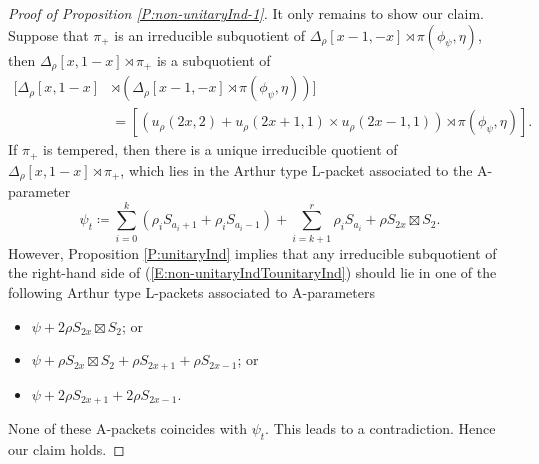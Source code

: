 \documentclass[11pt,letterpaper]{amsart}
\theoremstyle{plain}
\numberwithin{theorem}{section}
\numberwithin{equation}{subsection}
\theoremstyle{remark}
\begin{document}
\begin{proof}[Proof of Proposition \ref{P:non-unitaryInd-1}]
\vskip 5pt

It only remains to show our claim. Suppose that $\pi_+$ is an irreducible subquotient of $\Delta_\rho\left[x-1,-x\right] \rtimes \pi\left(\phi_\psi,\eta\right)$, then $\Delta_\rho\left[x,1-x\right]\rtimes \pi_+$ is a subquotient of
\begin{equation}\label{E:non-unitaryIndTounitaryInd}
\begin{aligned}
    \big[\Delta_\rho\left[x,1-x\right]&\rtimes \left(\Delta_\rho\left[x-1,-x\right] \rtimes \pi\left(\phi_\psi,\eta\right)\right)\big]\\
    & = \left[\left(u_\rho\left(2x,2\right) + u_\rho\left(2x+1,1\right) \times u_\rho\left(2x-1,1\right)\right)\rtimes \pi\left(\phi_\psi,\eta\right)\right].
\end{aligned}    
\end{equation}
If $\pi_+$ is tempered, then there is a unique irreducible quotient of $\Delta_\rho\left[x,1-x\right]\rtimes \pi_+$, which lies in the Arthur type L-packet associated to the A-parameter
\[
    \psi_t\coloneqq\sum_{i=0}^k \left(\rho_i S_{a_i+1} + \rho_i S_{a_i-1}\right) + \sum_{i=k+1}^r \rho_i S_{a_i} + \rho S_{2x}\boxtimes S_2.
\]
However, Proposition \ref{P:unitaryInd} implies that any irreducible subquotient of the right-hand side of (\ref{E:non-unitaryIndTounitaryInd}) should lie in one of the following Arthur type L-packets associated to A-parameters
\begin{itemize}
    \item $\psi+2\rho S_{2x}\boxtimes S_2$; or

    \vskip 5pt

    \item $\psi+\rho S_{2x}\boxtimes S_2 + \rho S_{2x+1}+ \rho S_{2x-1}$; or

    \vskip 5pt

    \item $\psi+ 2\rho S_{2x+1}+ 2\rho S_{2x-1}$.
\end{itemize}
\vskip 5pt
None of these A-packets coincides with $\psi_t$. This leads to a contradiction. Hence our claim holds.

\end{proof}

\vskip 10pt


\end{document}
